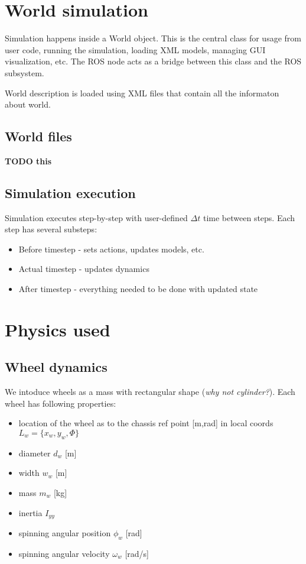 \documentclass[a4paper,11pt]{article}
\begin{document}
\newpage

\section{World simulation}
Simulation happens inside a World object.
This is the central class for usage from user code, running the simulation, loading XML models, managing GUI visualization, etc.
The ROS node acts as a bridge between this class and the ROS subsystem.

World description is loaded using XML files that contain all the informaton about world.

\subsection{World files}
\textbf{TODO this}
\newpage


\subsection{Simulation execution}
Simulation executes step-by-step with user-defined $\Delta t$ time between steps.
Each step has several substeps:
\begin{itemize}
\item Before timestep - sets actions, updates models, etc.
\item Actual timestep - updates dynamics
\item After timestep - everything needed to be done with updated state
\end{itemize}
\newpage

\section{Physics used}
\subsection{Wheel dynamics}

We intoduce wheels as a mass with rectangular shape (\textsl{why not cylinder?}).
Each wheel has following properties:
\begin{itemize}
\item location of the wheel as to the chassis ref point [m,rad] in local coords $L_w = \{ x_w, y_w, \Phi \}$
\item diameter $d_w$ [m]
\item width $w_w$ [m]
\item mass $m_w$ [kg]
\item inertia $I_{yy}$ 
\item spinning angular position $\phi_w$ [rad]
\item spinning angular velocity $\omega_w$ [rad/s]
\end{itemize}
\end{document}
